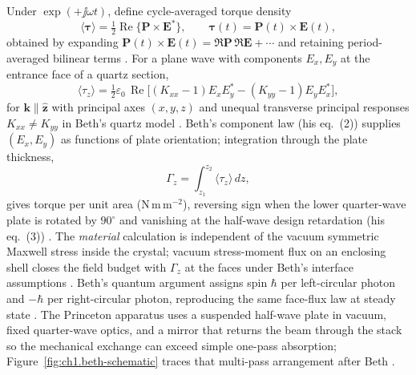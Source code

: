 Under $\exp(+\jj\omega t)$, define cycle-averaged torque density
\begin{equation}
\label{eq:ch1.beth-torque-cycle-average}
\langle\boldsymbol\tau\rangle=\tfrac12\operatorname{Re}\{\mathbf P\times\mathbf E^*\},
\qquad
\boldsymbol\tau(t)=\mathbf P(t)\times\mathbf E(t),
\end{equation}
obtained by expanding $\mathbf P(t)\times\mathbf E(t)=\Re\mathbf P\,\Re\mathbf E+\cdots$ and retaining period-averaged bilinear terms \cite{stratton1941,beth1936}. For a plane wave with components $E_x,E_y$ at the entrance face of a quartz section,
\begin{equation}
\label{eq:ch1.beth-torque-plane-components}
\langle\tau_z\rangle
=\tfrac12\varepsilon_0\,\operatorname{Re}\bigl[(K_{xx}-1)E_x E_y^*-(K_{yy}-1)E_y E_x^*\bigr],
\end{equation}
for $\mathbf{k}\parallel\hat{\mathbf{z}}$ with principal axes $(x,y,z)$ and unequal transverse principal responses $K_{xx}\neq K_{yy}$ in Beth's quartz model \cite{beth1936}. Beth's component law (his eq.~(2)) supplies $(E_x,E_y)$ as functions of plate orientation; integration through the plate thickness,
\begin{equation}
\label{eq:ch1.beth-torque-per-area}
\Gamma_z=\int_{z_1}^{z_2}\langle\tau_z\rangle\,dz,
\end{equation}
gives torque per unit area (N\,m\,m$^{-2}$), reversing sign when the lower quarter-wave plate is rotated by $90^\circ$ and vanishing at the half-wave design retardation (his eq.~(3)) \cite{beth1936}. The \emph{material} calculation is independent of the vacuum symmetric Maxwell stress inside the crystal; vacuum stress-moment flux on an enclosing shell closes the field budget with $\Gamma_z$ at the faces under Beth's interface assumptions \cite{beth1936,stratton1941}.
Beth's quantum argument assigns spin $\hbar$ per left-circular photon and $-\hbar$ per right-circular photon, reproducing the same face-flux law at steady state \cite{beth1936}. The Princeton apparatus uses a suspended half-wave plate in vacuum, fixed quarter-wave optics, and a mirror that returns the beam through the stack so the mechanical exchange can exceed simple one-pass absorption; Figure~\ref{fig:ch1.beth-schematic} traces that multi-pass arrangement after Beth \cite{beth1936}.

